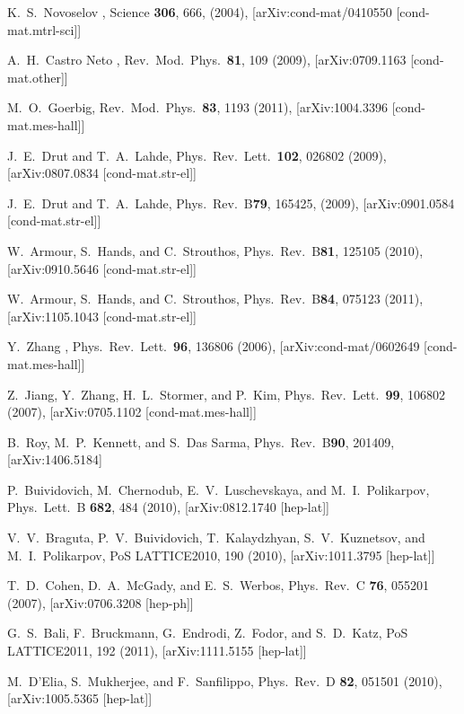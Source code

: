 \documentclass[aps,prd,twocolumn,showpacs,superscriptaddress,groupedaddress]{revtex4}  %
\begin{document}
\begin{thebibliography}{99}

K.~S.~Novoselov \etal, Science {\bf 306}, 666, (2004), [arXiv:cond-mat/0410550 [cond-mat.mtrl-sci]]

A.~H.~Castro Neto \etal, Rev.\ Mod.\ Phys.\ {\bf 81}, 109 (2009), [arXiv:0709.1163 [cond-mat.other]]

M.~O.~Goerbig, Rev.\ Mod.\ Phys.\ {\bf 83}, 1193  (2011), [arXiv:1004.3396 [cond-mat.mes-hall]]

J.~E.~Drut and T.~A.~Lahde, Phys.\ Rev.\ Lett.\ {\bf 102}, 026802 (2009), [arXiv:0807.0834 [cond-mat.str-el]]

J.~E.~Drut and T.~A.~Lahde, Phys.\ Rev.\ B{\bf79}, 165425, (2009), [arXiv:0901.0584 [cond-mat.str-el]]

W.~Armour, S.~Hands, and C.~Strouthos, Phys.\ Rev.\ B{\bf 81}, 125105 (2010), [arXiv:0910.5646 [cond-mat.str-el]]

W.~Armour, S.~Hands, and C.~Strouthos, Phys.\ Rev.\ B{\bf 84}, 075123 (2011), [arXiv:1105.1043 [cond-mat.str-el]]

Y.~Zhang \etal, Phys.\ Rev.\ Lett.\ {\bf 96}, 136806 (2006), [arXiv:cond-mat/0602649 [cond-mat.mes-hall]]

Z.~Jiang, Y.~Zhang, H.~L.~Stormer, and P.~Kim, Phys.\ Rev.\ Lett.\ {\bf 99}, 106802 (2007), [arXiv:0705.1102 [cond-mat.mes-hall]]

B.~Roy, M.~P.~Kennett, and S.~Das Sarma, Phys.\ Rev.\ B{\bf 90}, 201409, [arXiv:1406.5184]

P.~Buividovich, M.~Chernodub, E.~V.~Luschevskaya, and M.~I.~Polikarpov, Phys.\ Lett.\ B {\bf 682}, 484 (2010), [arXiv:0812.1740 [hep-lat]]

V.~V.~Braguta, P.~V.~Buividovich, T.~Kalaydzhyan, S.~V.~Kuznetsov, and M.~I.~Polikarpov, PoS LATTICE2010, 190 (2010), [arXiv:1011.3795 [hep-lat]]

T.~D.~Cohen, D.~A.~McGady, and E.~S.~Werbos, Phys.\ Rev.\ C {\bf 76}, 055201 (2007), [arXiv:0706.3208 [hep-ph]]

G.~S.~Bali, F.~Bruckmann, G.~Endrodi, Z.~Fodor, and S.~D.~Katz, PoS LATTICE2011, 192 (2011), [arXiv:1111.5155 [hep-lat]]

M.~D'Elia, S.~Mukherjee, and F.~Sanfilippo, Phys.\ Rev.\ D {\bf 82}, 051501 (2010), [arXiv:1005.5365 [hep-lat]]


\end{thebibliography}
\end{document}
